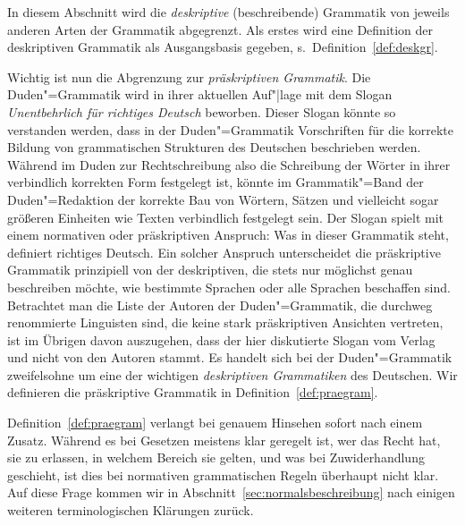 In diesem Abschnitt wird die \textit{deskriptive} (beschreibende) Grammatik von jeweils anderen Arten der Grammatik abgegrenzt.
Als erstes wird eine Definition der deskriptiven Grammatik als Ausgangsbasis gegeben, s.\ Definition~\ref{def:deskgr}.

\Np


Wichtig ist nun die Abgrenzung zur \textit{präskriptiven Grammatik}.
Die Duden"=Grammatik \citep{Duden8} wird in ihrer aktuellen Auf"|lage mit dem Slogan \textit{Unentbehrlich für richtiges Deutsch} beworben.
Dieser Slogan könnte so verstanden werden, dass in der Duden"=Grammatik Vorschriften für die korrekte Bildung von grammatischen Strukturen des Deutschen beschrieben werden.
Während im Duden zur Rechtschreibung also die Schreibung der Wörter in ihrer verbindlich korrekten Form festgelegt ist, könnte im Grammatik"=Band der Duden"=Redaktion der korrekte Bau von Wörtern, Sätzen und vielleicht sogar größeren Einheiten wie Texten verbindlich festgelegt sein.
Der Slogan spielt mit einem normativen oder präskriptiven Anspruch:
Was in dieser Grammatik steht, definiert richtiges Deutsch.
Ein solcher Anspruch unterscheidet die präskriptive Grammatik prinzipiell von der deskriptiven, die stets nur möglichst genau beschreiben möchte, wie bestimmte Sprachen oder alle Sprachen beschaffen sind.
Betrachtet man die Liste der Autoren der Duden"=Grammatik, die durchweg renommierte Linguisten sind, die keine stark präskriptiven Ansichten vertreten, ist im Übrigen davon auszugehen, dass der hier diskutierte Slogan vom Verlag und nicht von den Autoren stammt.
Es handelt sich bei der Duden"=Grammatik zweifelsohne um eine der wichtigen \textit{deskriptiven Grammatiken} des Deutschen.
Wir definieren die präskriptive Grammatik in Definition~\ref{def:praegram}.



Definition~\ref{def:praegram} verlangt bei genauem Hinsehen sofort nach einem Zusatz.
Während es bei Gesetzen meistens klar geregelt ist, wer das Recht hat, sie zu erlassen, in welchem Bereich sie gelten, und was bei Zuwiderhandlung geschieht, ist dies bei normativen grammatischen Regeln überhaupt nicht klar.
Auf diese Frage kommen wir in Abschnitt~\ref{sec:normalsbeschreibung} nach einigen weiteren terminologischen Klärungen zurück.

